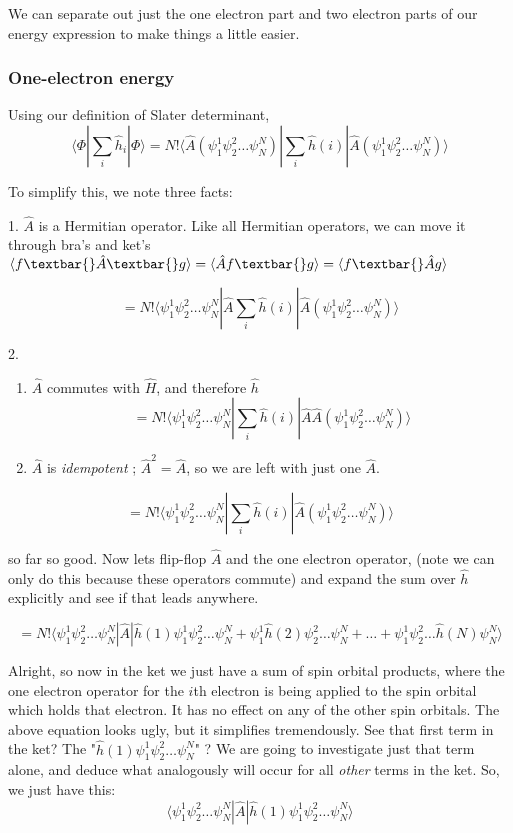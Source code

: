 \documentclass[11pt]{article}
\begin{document}
We can separate out just the one electron part and two electron parts of
our energy expression to make things a little easier.

\subsubsection{One-electron energy}
Using our definition of Slater determinant,
\[ \langle \Phi | \sum\limits_{i} \hat{h}_i | \Phi \rangle = N! \langle \hat{A} (\psi_1^1 \psi_2^2 \dots \psi_N^N) |  \sum\limits_{i} \hat{h}(i)  | \hat{A} (\psi_1^1 \psi_2^2 \dots \psi_N^N) \rangle \]

To simplify this, we note three facts: 

1. \(\hat{A}\) is a Hermitian
operator. Like all Hermitian operators, we can move it through bra's and
ket's $\langle f \textbar{} \hat{A}\textbar{} g \rangle =
\langle \hat{A} f \textbar{} g \rangle = \langle f \textbar{} \hat{A} g
\rangle $

\[ = N! \langle \psi_1^1 \psi_2^2 \dots \psi_N^N | \hat{A}  \sum\limits_{i} \hat{h}(i)  | \hat{A} (\psi_1^1 \psi_2^2 \dots \psi_N^N) \rangle \]

2. 

\begin{enumerate}
\def\labelenumi{\arabic{enumi}.}
\setcounter{enumi}{1}
\item
  \(\hat{A}\) commutes with \(\hat{H}\), and therefore \(\hat{h}\)
  \[ = N! \langle \psi_1^1 \psi_2^2 \dots \psi_N^N |  \sum\limits_{i} \hat{h}(i)  | \hat{A}  \hat{A} (\psi_1^1 \psi_2^2 \dots \psi_N^N) \rangle \]
\item
  \(\hat{A}\) is \emph{idempotent} ; \(\hat{A}^2 = \hat{A}\), so we are
  left with just one \(\hat{A}\).
\end{enumerate}

\[ = N! \langle \psi_1^1 \psi_2^2 \dots \psi_N^N |  \sum\limits_{i} \hat{h}(i)  | \hat{A} (\psi_1^1 \psi_2^2 \dots \psi_N^N) \rangle \]

    so far so good. Now lets flip-flop \(\hat{A}\) and the one electron
operator, (note we can only do this because these operators commute) and expand the sum over \(\hat{h}\)
explicitly and see if that leads anywhere.

\[ = N! \langle \psi_1^1 \psi_2^2 \dots \psi_N^N | \hat{A} |  \hat{h}(1)\psi_1^1 \psi_2^2 \dots \psi_N^N + \psi_1^1 \hat{h}(2) \psi_2^2 \dots \psi_N^N  + \dots + \psi_1^1  \psi_2^2 \dots \hat{h}(N) \psi_N^N \rangle \]

Alright, so now in the ket we just have a sum of spin orbital products,
where the one electron operator for the \(i\)th electron is being
applied to the spin orbital which holds that electron. It has no effect
on any of the other spin orbitals. The above equation looks ugly, but it
simplifies tremendously. See that first term in the ket? The 
"$\hat{h}(1)\psi_1^1 \psi_2^2 \dots \psi_N^N$" ? We are
going to investigate just that term alone, and deduce what analogously
will occur for all \emph{other} terms in the ket. So, we just have this:
\[ \langle \psi_1^1 \psi_2^2 \dots \psi_N^N | \hat{A} |  \hat{h}(1)\psi_1^1 \psi_2^2 \dots \psi_N^N \rangle \]
\end{document}
